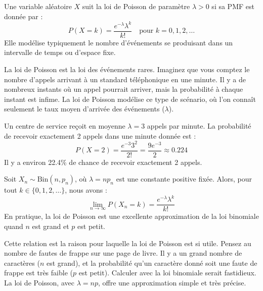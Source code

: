 \begin{definitionbox}
Une variable aléatoire $X$ suit la loi de Poisson de paramètre $\lambda > 0$ si sa PMF est donnée par :
$$ P(X=k) = \frac{e^{-\lambda} \lambda^k}{k!} \quad \text{pour } k=0, 1, 2, \dots $$
Elle modélise typiquement le nombre d'événements se produisant dans un intervalle de temps ou d'espace fixe.
\end{definitionbox}

\begin{intuitionbox}
La loi de Poisson est la loi des événements rares. Imaginez que vous comptez le nombre d'appels arrivant à un standard téléphonique en une minute. Il y a de nombreux instants où un appel pourrait arriver, mais la probabilité à chaque instant est infime. La loi de Poisson modélise ce type de scénario, où l'on connaît seulement le taux moyen d'arrivée des événements ($\lambda$).
\end{intuitionbox}

\begin{examplebox}
Un centre de service reçoit en moyenne $\lambda=3$ appels par minute. La probabilité de recevoir exactement 2 appels dans une minute donnée est :
$$ P(X=2) = \frac{e^{-3} 3^2}{2!} = \frac{9e^{-3}}{2} \approx 0.224 $$
Il y a environ 22.4\% de chance de recevoir exactement 2 appels.
\end{examplebox}

\begin{theorembox}
Soit $X_n \sim \text{Bin}(n, p_n)$, où $\lambda = np_n$ est une constante positive fixée. Alors, pour tout $k \in \{0, 1, 2, \dots\}$, nous avons :
$$ \lim_{n \to \infty} P(X_n=k) = \frac{e^{-\lambda}\lambda^k}{k!} $$
En pratique, la loi de Poisson est une excellente approximation de la loi binomiale quand $n$ est grand et $p$ est petit.
\end{theorembox}

\begin{intuitionbox}
Cette relation est la raison pour laquelle la loi de Poisson est si utile. Pensez au nombre de fautes de frappe sur une page de livre. Il y a un grand nombre de caractères ($n$ est grand), et la probabilité qu'un caractère donné soit une faute de frappe est très faible ($p$ est petit). Calculer avec la loi binomiale serait fastidieux. La loi de Poisson, avec $\lambda=np$, offre une approximation simple et très précise.
\end{intuitionbox}

